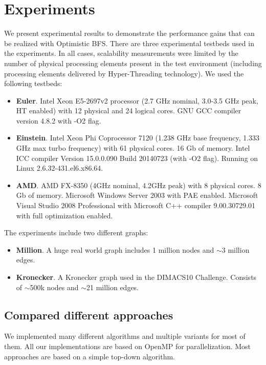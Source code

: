 \documentclass[letterpaper]{article}
\begin{document}
	\section{Experiments}\label{sec:expe} %
		We present experimental results to demonstrate the performance gains that can be realized with Optimistic BFS.
		There are three experimental testbeds used in the experiments. 
		In all cases, scalability measurements were limited by the number of physical processing elements present in the test environment (including processing elements delivered by Hyper-Threading technology).
		We used the following testbeds:
		\begin{itemize}
			\item \textbf{Euler}. Intel Xeon E5-2697v2 processor (2.7 GHz nominal, 3.0-3.5 GHz peak, HT enabled) with 12 physical and 24 logical cores. GNU GCC compiler version 4.8.2 with -O2 flag. 
			\item \textbf{Einstein}. Intel Xeon Phi Coprocessor 7120 (1.238 GHz base frequency, 1.333 GHz max turbo frequency) with 61 physical cores. 16 Gb of memory.
			Intel ICC compiler Version 15.0.0.090 Build 20140723 (with -O2 flag).
			Running on Linux 2.6.32-431.el6.x86.64.
			

			\item \textbf{AMD}. AMD FX-8350 (4GHz nominal, 4.2GHz peak) with 8 physical cores. 8 Gb of memory. Microsoft Windows Server 2003 with PAE enabled. Microsoft Visual Studio 2008 Professional with  Microsoft C++ compiler 9.00.30729.01 with full optimization enabled.
		\end{itemize}
		The experiments include two different graphs:
		\begin{itemize}
			\item \textbf{Million}. A huge real world graph includes 1 million nodes and $\sim$3 million edges.
			\item \textbf{Kronecker}. A Kronecker graph used in the DIMACS10 Challenge. Consists of $\sim$500k nodes and $\sim$21 million edges.
		\end{itemize}
		
		\subsection{Compared different approaches}\label{sec:approaches}
		
		We implemented many different algorithms and multiple variants for most of them. 			%
		All our implementations are based on OpenMP for parallelization.
		Most approaches are based on a simple top-down algorithm. 
\end{document}
